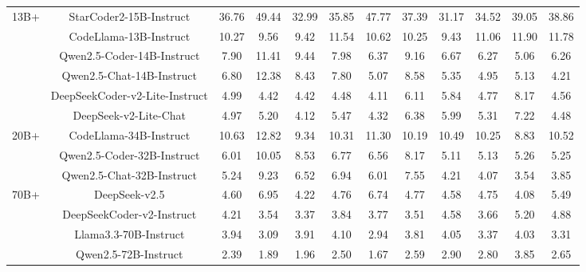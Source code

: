 \documentclass[11pt, a4paper, logo, copyright, nonumbering, amsart]{map}
\begin{document}
\begin{CJK*}{UTF8}{gbsn}
\begin{table*}[h!]
\begin{adjustbox}{width=\textwidth}
\begin{tabular}{c|c|cccccccccc}
    \midrule
    \multirow{6}{*}{13B+} 
    & StarCoder2-15B-Instruct & 36.76 & 49.44 & 32.99 & 35.85 & 47.77 & 37.39 & 31.17 & 34.52 & 39.05 & 38.86 \\
    & CodeLlama-13B-Instruct & 10.27 & 9.56 & 9.42 & 11.54 & 10.62 & 10.25 & 9.43 & 11.06 & 11.90 & 11.78 \\
    & Qwen2.5-Coder-14B-Instruct & 7.90 & 11.41 & 9.44 & 7.98 & 6.37 & 9.16 & 6.67 & 6.27 & 5.06 & 6.26 \\
    & Qwen2.5-Chat-14B-Instruct & 6.80 & 12.38 & 8.43 & 7.80 & 5.07 & 8.58 & 5.35 & 4.95 & 5.13 & 4.21 \\
    & DeepSeekCoder-v2-Lite-Instruct & 4.99 & 4.42 & 4.42 & 4.48 & 4.11 & 6.11 & 5.84 & 4.77 & 8.17 & 4.56 \\
    & DeepSeek-v2-Lite-Chat & 4.97 & 5.20 & 4.12 & 5.47 & 4.32 & 6.38 & 5.99 & 5.31 & 7.22 & 4.48 \\
        
    \midrule
    \multirow{3}{*}{20B+}
    & CodeLlama-34B-Instruct & 10.63 & 12.82 & 9.34 & 10.31 & 11.30 & 10.19 & 10.49 & 10.25 & 8.83 & 10.52 \\
    & Qwen2.5-Coder-32B-Instruct & 6.01 & 10.05 & 8.53 & 6.77 & 6.56 & 8.17 & 5.11 & 5.13 & 5.26 & 5.25 \\
    & Qwen2.5-Chat-32B-Instruct & 5.24 & 9.23 & 6.52 & 6.94 & 6.01 & 7.55 & 4.21 & 4.07 & 3.54 & 3.85 \\
        
    \midrule
    \multirow{4}{*}{70B+} 
    & DeepSeek-v2.5 & 4.60 & 6.95 & 4.22 & 4.76 & 6.74 & 4.77 & 4.58 & 4.75 & 4.08 & 5.49 \\
    & DeepSeekCoder-v2-Instruct & 4.21 & 3.54 & 3.37 & 3.84 & 3.77 & 3.51 & 4.58 & 3.66 & 5.20 & 4.88 \\
    & Llama3.3-70B-Instruct & 3.94 & 3.09 & 3.91 & 4.10 & 2.94 & 3.81 & 4.05 & 3.37 & 4.03 & 3.31 \\
    & Qwen2.5-72B-Instruct & 2.39 & 1.89 & 1.96 & 2.50 & 1.67 & 2.59 & 2.90 & 2.80 & 3.85 & 2.65 \\
        

\end{tabular}
\end{adjustbox}
\end{table*}
\end{CJK*}
\end{document}
